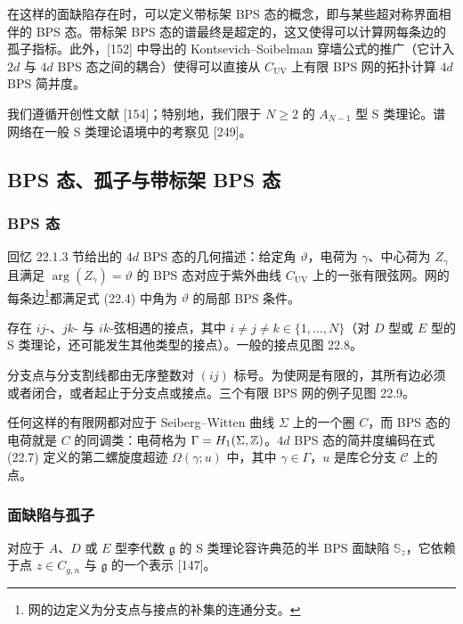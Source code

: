 在这样的面缺陷存在时，可以定义带标架 BPS 态的概念，即与某些超对称界面相伴的 BPS 态。带标架 BPS 态的谱最终是超定的，这又使得可以计算网每条边的孤子指标。此外，[152] 中导出的 Kontsevich–Soibelman 穿墙公式的推广（它计入 $2d$ 与 $4d$ BPS 态之间的耦合）使得可以直接从 $C_{\mathrm{UV}}$ 上有限 BPS 网的拓扑计算 $4d$ BPS 简并度。

我们遵循开创性文献 [154]；特别地，我们限于 $N\ge2$ 的 $A_{N-1}$ 型 S 类理论。谱网络在一般 S 类理论语境中的考察见 [249]。

\subsection{BPS 态、孤子与带标架 BPS 态}

\subsubsection*{BPS 态}

回忆 22.1.3 节给出的 $4d$ BPS 态的几何描述：给定角 $\vartheta$，电荷为 $\gamma$、中心荷为 $Z_\gamma$ 且满足 $\arg(Z_\gamma)=\vartheta$ 的 BPS 态对应于紫外曲线 $C_{\mathrm{UV}}$ 上的一张有限弦网。网的每条边\footnote{网的边定义为分支点与接点的补集的连通分支。}都满足式 (22.4) 中角为 $\vartheta$ 的局部 BPS 条件。

存在 $ij$-、$jk$- 与 $ik$-弦相遇的接点，其中 $i\ne j\ne k\in\{1,\dots,N\}$（对 $D$ 型或 $E$ 型的 S 类理论，还可能发生其他类型的接点）。一般的接点见图 22.8。


分支点与分支割线都由无序整数对 $(ij)$ 标号。为使网是有限的，其所有边必须或者闭合，或者起止于分支点或接点。三个有限 BPS 网的例子见图 22.9。

任何这样的有限网都对应于 Seiberg–Witten 曲线 $\Sigma$ 上的一个圈 $C$，而 BPS 态的电荷就是 $C$ 的同调类：电荷格为 $\Gamma=H_1(\Sigma,\mathbb{Z})$。$4d$ BPS 态的简并度编码在式 (22.7) 定义的第二螺旋度超迹 $\Omega(\gamma;u)$ 中，其中 $\gamma\in\Gamma$，$u$ 是库仑分支 $\mathcal{C}$ 上的点。


\subsubsection*{面缺陷与孤子}

\begin{proposition}[22.16]
对应于 $A$、$D$ 或 $E$ 型李代数 $\mathfrak{g}$ 的 S 类理论容许典范的半 BPS 面缺陷 $\mathbb{S}_z$，它依赖于点 $z\in C_{g,n}$ 与 $\mathfrak{g}$ 的一个表示 [147]。
\end{proposition}

